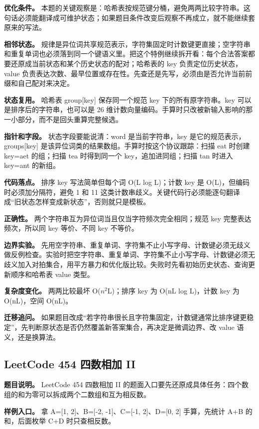 \textbf{优化条件。} 本题的关键观察是：哈希表按规范键分桶，避免两两比较字符串。这句话必须能翻译成可维护状态；如果题目条件改变后观察不再成立，就不能继续套原来的写法。

\textbf{相邻状态。} 规律是异位词共享规范表示，字符集固定时计数键更直接；空字符串和重复单词也必须落到同一个键语义里。把这个特例继续拆开看：每个合法答案都要还原成当前状态和某个历史状态的配对；哈希表的 key 负责定位历史状态，value 负责表达次数、最早位置或存在性。先查还是先写，必须由是否允许当前前缀和自己配对来决定。

\textbf{状态复用。} 哈希表 group[key] 保存同一个规范 key 下的所有原字符串。key 可以是排序后的字符串，也可以是 26 维计数向量编码。手算时只改被新输入影响的那一小部分，而不是回头重算完整候选。

\textbf{指针和字段。} 状态字段要能说清：word 是当前字符串，key 是它的规范表示，groups[key] 是该异位词类的结果数组。手算时按这个协议跟踪：扫描 eat 时创建 key=aet 的组；扫描 tea 时得到同一个 key，追加进同组；扫描 tan 时进入 key=ant 的新组。

\textbf{代码落点。} 排序 key 写法简单但每个词 O(L log L)；计数 key 是 O(L)，但编码时必须加分隔符，避免 1 和 11 这类计数串歧义。关键代码行必须能逐句翻译成“旧状态怎样变成新状态”，否则就只是模板。

\textbf{正确性。} 两个字符串互为异位词当且仅当字符频次完全相同；规范 key 完整表达频次，所以同 key 等价、不同 key 不等价。

\textbf{边界实验。} 先用空字符串、重复单词、字符集不止小写字母、计数键必须无歧义做反例检查。实验时把空字符串、重复单词、字符集不止小写字母、计数键必须无歧义加入对拍集合，用平方暴力和优化版比较。失败时先看初始历史状态、查询更新顺序和哈希表 value 类型。

\textbf{复杂度变化。} 两两比较最坏 O(\ensuremath{n^{2}}L)；排序 key 为 O(nL log L)，计数 key 为 O(nL)，空间 O(nL)。

\textbf{迁移追问。} 如果题目改成“若字符串很长且字符集固定，计数键通常比排序键更稳定”，先判断原状态是否仍然覆盖新答案集合，再决定是微调边界、改 value 语义，还是换算法。

\subsection{LeetCode 454 四数相加 II}

\textbf{题目说明。} LeetCode 454 四数相加 II 的题面入口要先还原成具体任务：四个数组的和为零可以拆成两个二数组和互为相反数。

\textbf{样例入口。} 拿 A=[1, 2]、B=[-2, -1]、C=[-1, 2]、D=[0, 2] 手算，先统计 A+B 的和，后面枚举 C+D 时只查相反数。

